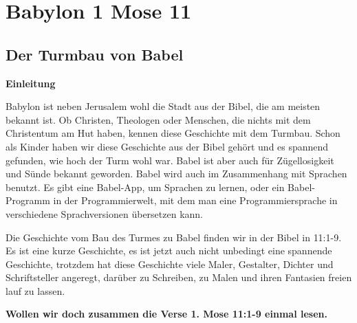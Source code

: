 \documentclass[14pt]{../../inc/mybib}
\author{Lothar Schmid}
\newenvironment{block}[1][]{%
  \vspace{1.5em}%
  \noindent\textbf{#1}\par%
  \vspace{0.0em}%
}{%
  \vspace{1em}%
}
\begin{document}
\setlength{\baselineskip}{1.5\baselineskip}
\section{Babylon 1 Mose 11}

\subsection{Der Turmbau von Babel}
    \begin{block}[Einleitung]
    Babylon ist neben Jerusalem wohl die Stadt aus der Bibel, die am meisten bekannt ist. Ob Christen, Theologen oder Menschen, die nichts mit dem Christentum am Hut haben, kennen diese Geschichte mit dem Turmbau. Schon als Kinder haben wir diese Geschichte aus der Bibel gehört und es spannend gefunden, wie hoch der Turm wohl war. Babel ist aber auch für Zügellosigkeit und Sünde bekannt geworden. Babel wird auch im Zusammenhang mit Sprachen benutzt. Es gibt eine Babel-App, um Sprachen zu lernen, oder ein Babel-Programm in der Programmierwelt, mit dem man eine Programmiersprache in verschiedene Sprachversionen übersetzen kann.
    \end{block}
    \begin{block}
    Die Geschichte vom Bau des Turmes zu Babel finden wir in der Bibel in  {11:1-9}. Es ist eine kurze Geschichte, es ist jetzt auch nicht unbedingt eine spannende Geschichte, trotzdem hat diese Geschichte viele Maler, Gestalter, Dichter und Schriftsteller angeregt, darüber zu Schreiben, zu Malen und ihren Fantasien freien lauf zu lassen. 
    \end{block}

    \textbf{Wollen wir doch zusammen die Verse 1. Mose 11:1-9 einmal lesen.}
    
\end{document}
